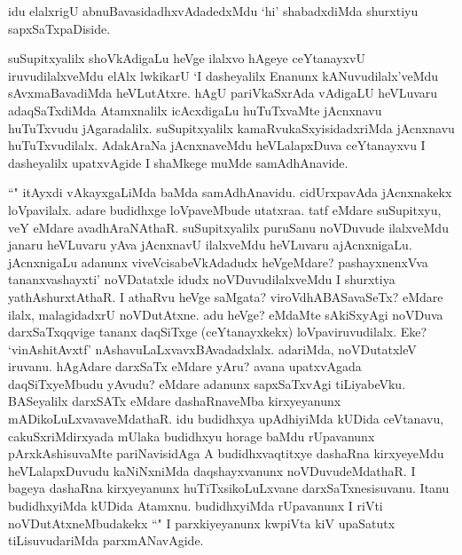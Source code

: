\begin{artha}
idu elalxrigU abnuBavasidadhxvAdadedxMdu `hi' shabadxdiMda shurxtiyu sapxSaTxpaDiside.
\end{artha}


\begin{artha}
suSupitxyalilx shoVkAdigaLu heVge ilalxvo hAgeye ceYtanayxvU iruvudilalxveMdu elAlx lwkikarU `I dasheyalilx Enanunx kANuvudilalx'veMdu sAvxmaBavadiMda heVLutAtxre. hAgU pariVkaSxrAda vAdigaLU heVLuvaru adaqSaTxdiMda Atamxnalilx icAcxdigaLu huTuTxvaMte jAcnxnavu huTuTxvudu jAgaradalilx. suSupitxyalilx kamaRvukaSxyisidadxriMda jAcnxnavu huTuTxvudilalx. AdakAraNa jAcnxnaveMdu heVLalapxDuva ceYtanayxvu I dasheyalilx upatxvAgide I shaMkege muMde samAdhAnavide. 
\end{artha}

\begin{artha}
``\stext " itAyxdi vAkayxgaLiMda baMda samAdhAnavidu. cidUrxpavAda jAcnxnakekx loVpavilalx. adare budidhxge loVpaveMbude utatxraa. tatf eMdare suSupitxyu, veY eMdare avadhAraNAthaR. suSupitxyalilx puruSanu noVDuvude ilalxveMdu janaru heVLuvaru yAva jAcnxnavU ilalxveMdu heVLuvaru ajAcnxnigaLu. jAcnxnigaLu adanunx viveVcisabeVkAdadudx heVgeMdare? pashayxnenxVva tananxvashayxti' noVDatatxle idudx noVDuvudilalxveMdu I shurxtiya yathAshurxtAthaR. I athaRvu heVge saMgata? viroVdhABASavaSeTx? eMdare ilalx, malagidadxrU noVDutAtxne. adu heVge? \stext eMdaMte sAkiSxyAgi noVDuva darxSaTxqqvige tananx daqSiTxge (ceYtanayxkekx) loVpaviruvudilalx. Eke? `vinAshitAvxtf' nAshavuLaLxvavxBAvadadxlalx. adariMda, noVDutatxleV iruvanu. hAgAdare darxSaTx eMdare yAru? avana upatxvAgada daqSiTxyeMbudu yAvudu? eMdare adanunx sapxSaTxvAgi tiLiyabeVku. BASeyalilx darxSATx eMdare dashaRnaveMba kirxyeyanunx mADikoLuLxvavaveMdathaR. idu budidhxya upAdhiyiMda kUDida ceVtanavu, cakuSxriMdirxyada mUlaka budidhxyu horage baMdu rUpavanunx pArxkAshisuvaMte pariNavisidAga A budidhxvaqtitxye dashaRna kirxyeyeMdu heVLalapxDuvudu kaNiNxniMda daqshayxvanunx noVDuvudeMdathaR. I bageya dashaRna kirxyeyanunx huTiTxsikoLuLxvane darxSaTxnesisuvanu. Itanu budidhxyiMda kUDida Atamxnu. budidhxyiMda rUpavanunx I riVti noVDutAtxneMbudakekx ``\stext " I parxkiyeyanunx kwpiVta kiV upaSatutx tiLisuvudariMda parxmANavAgide. 
\end{artha}%

